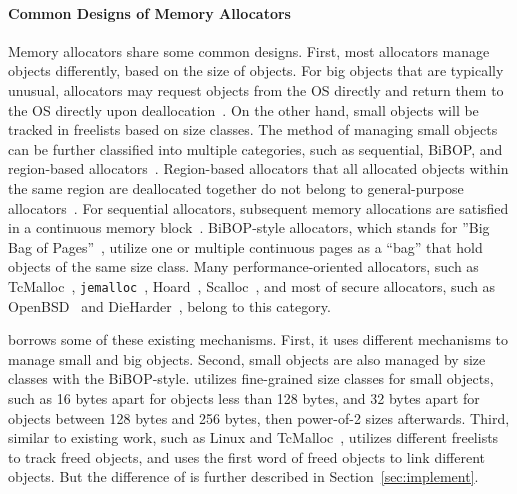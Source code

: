 


\paragraph{Common Designs of Memory Allocators}
Memory allocators share some common designs. First, most allocators manage objects differently, based on the size of objects. For big objects that are typically unusual, allocators may request objects from the OS directly and return them to the OS directly upon deallocation~\citep{Hoard}. On the other hand, small objects will be tracked in freelists based on size classes. The method of managing small objects can be further classified into multiple categories, such as sequential, BiBOP, and region-based allocators~\citep{DieHarder, Gay:1998:MME:277650.277748}. Region-based allocators that  all allocated objects within the same region are deallocated together do not belong to general-purpose allocators~\citep{Gay:1998:MME:277650.277748}. For sequential allocators, subsequent memory allocations are satisfied in a continuous memory block~\citep{Cling}. BiBOP-style allocators, which stands for ''Big Bag of Pages''~\citep{hanson1980portable}, utilize one or multiple continuous pages as a ``bag'' that hold objects of the same size class. Many performance-oriented allocators, such as TcMalloc~\citep{tcmalloc}, \texttt{jemalloc}~\citep{jemalloc}, Hoard~\citep{Hoard}, Scalloc~\citep{Scalloc}, and most of secure allocators, such as OpenBSD~\citep{openbsd} and DieHarder~\citep{DieHarder}, belong to this category. 

\NM{} borrows some of these existing mechanisms. First, it uses different mechanisms to manage small and big objects. Second, small objects are also managed by size classes with the BiBOP-style. \NA{} utilizes fine-grained size classes for small objects, such as 16 bytes apart for objects less than 128 bytes, and 32 bytes apart for objects between 128 bytes and 256 bytes, then power-of-2 sizes afterwards. Third, similar to existing work, such as Linux and TcMalloc~\cite{tcmalloc}, \NA{} utilizes different freelists to track freed objects, and uses the first word of freed objects to link different objects. But the difference of \NM{} is further described in Section~\ref{sec:implement}. 

